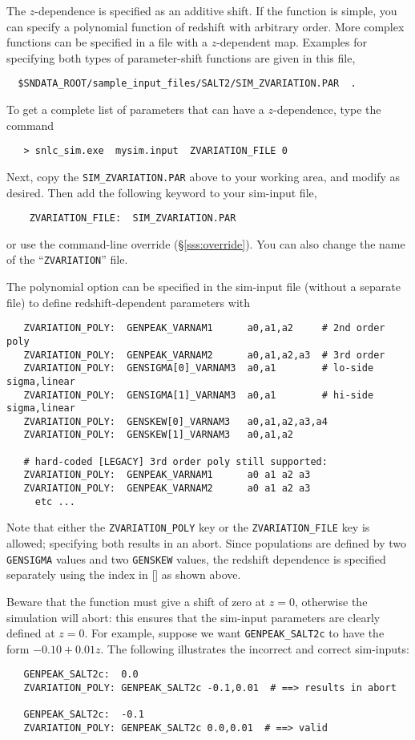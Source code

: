 \documentclass[12pt]{article}
\begin{document}
The $z$-dependence is specified as an additive shift.
If the function is simple, you can specify a polynomial
function of redshift with arbitrary order.
More complex functions can be specified in a file with a $z$-dependent map.
Examples for specifying both types of parameter-shift 
functions are given in this file,
%
\begin{verbatim}
  $SNDATA_ROOT/sample_input_files/SALT2/SIM_ZVARIATION.PAR  .
\end{verbatim}
To get a complete list of parameters that can have a
$z$-dependence, type the command
\begin{verbatim}
   > snlc_sim.exe  mysim.input  ZVARIATION_FILE 0 
\end{verbatim}
%
Next, copy the {\tt SIM\_ZVARIATION.PAR} above to your working area,
and modify as desired. Then add the following keyword to 
your sim-input file,
\begin{verbatim}
    ZVARIATION_FILE:  SIM_ZVARIATION.PAR
\end{verbatim}
%
or use the command-line override (\S\ref{sss:override}).
You can also change the name of the ``{\tt ZVARIATION}'' file.

\bigskip
The polynomial option can be specified in the sim-input file
(without a separate file) to define redshift-dependent parameters
with
%
\begin{verbatim}
   ZVARIATION_POLY:  GENPEAK_VARNAM1      a0,a1,a2     # 2nd order poly
   ZVARIATION_POLY:  GENPEAK_VARNAM2      a0,a1,a2,a3  # 3rd order
   ZVARIATION_POLY:  GENSIGMA[0]_VARNAM3  a0,a1        # lo-side sigma,linear
   ZVARIATION_POLY:  GENSIGMA[1]_VARNAM3  a0,a1        # hi-side sigma,linear
   ZVARIATION_POLY:  GENSKEW[0]_VARNAM3   a0,a1,a2,a3,a4
   ZVARIATION_POLY:  GENSKEW[1]_VARNAM3   a0,a1,a2

   # hard-coded [LEGACY] 3rd order poly still supported: 
   ZVARIATION_POLY:  GENPEAK_VARNAM1      a0 a1 a2 a3
   ZVARIATION_POLY:  GENPEAK_VARNAM2      a0 a1 a2 a3
     etc ...
\end{verbatim}


Note that either the {\tt ZVARIATION\_POLY} key or the 
{\tt ZVARIATION\_FILE} key is allowed; 
specifying both results in an abort.
Since populations are defined by two {\tt GENSIGMA} values
and two {\tt GENSKEW} values,
the redshift dependence is specified separately 
using the index in [] as shown above. 


Beware that the function must give a shift of zero at $z=0$,
otherwise the simulation will abort: this ensures 
that the sim-input parameters are clearly defined at $z=0$.
For example, suppose we want {\tt GENPEAK\_SALT2c} to have
the form $-0.10+0.01z$. The following illustrates
the incorrect and correct sim-inputs:
\begin{verbatim}
   GENPEAK_SALT2c:  0.0
   ZVARIATION_POLY: GENPEAK_SALT2c -0.1,0.01  # ==> results in abort

   GENPEAK_SALT2c:  -0.1
   ZVARIATION_POLY: GENPEAK_SALT2c 0.0,0.01  # ==> valid
\end{verbatim}
\end{document}

